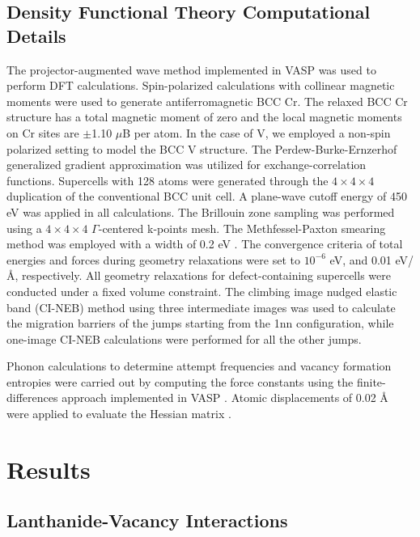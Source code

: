 \documentclass[preprint,12pt]{elsarticle}
\begin{document}
\subsection{Density Functional Theory Computational Details}
\label{sec:methods:dft}
The projector-augmented wave method implemented in VASP \cite{kresse_ab_1993, kresse_efficient_1996} was used to perform DFT calculations. Spin-polarized calculations with collinear magnetic moments were used to generate antiferromagnetic BCC Cr. The relaxed BCC Cr structure has a total magnetic moment of zero and the local magnetic moments on Cr sites are $\pm$1.10 $\mu$B per atom.
In the case of V, we employed a non-spin polarized setting to model the BCC V structure.
The Perdew-Burke-Ernzerhof generalized gradient approximation \cite{perdew_generalized_1996} was utilized for exchange-correlation functions. Supercells with 128 atoms were generated through the $4\times4\times4$ duplication of the conventional BCC unit cell. A plane-wave cutoff energy of 450 eV was applied in all calculations. The Brillouin zone sampling was performed using a $4\times4\times4$ $\Gamma$-centered k-points mesh. The Methfessel-Paxton smearing method was employed with a width of 0.2 eV  \cite{methfessel_high-precision_1989}. 
The convergence criteria of total energies and forces during geometry relaxations were set to $10^{-6}$ eV, and 0.01 eV/\AA, respectively. All geometry relaxations for defect-containing supercells were conducted under a fixed volume constraint. The climbing image nudged elastic band (CI-NEB) method \cite{henkelman_climbing_2000} using three intermediate images was used to calculate the migration barriers of the jumps starting from the 1nn configuration, while one-image CI-NEB calculations were performed for all the other jumps.

Phonon calculations to determine attempt frequencies and vacancy formation entropies were carried out by computing the force constants using the finite-differences approach implemented in VASP \cite{kresse_ab_1993, kresse_efficient_1996}. Atomic displacements of 0.02 {\AA} were applied to evaluate the Hessian matrix \cite{hafner_ab-initio_2008}.

\section{Results}

\subsection{Lanthanide-Vacancy Interactions}
\end{document}
